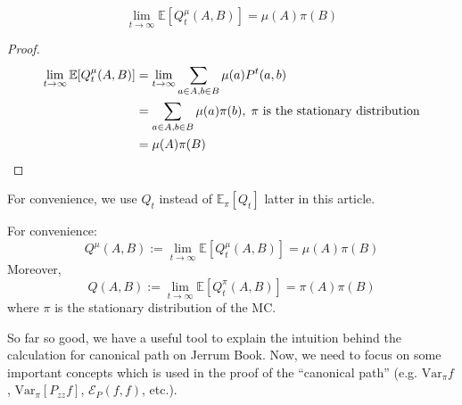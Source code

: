 \begin{corollary}
  \[\lim_{t\to\infty} \mathbb{E}[Q_t^\mu(A, B)] = \mu(A)\pi(B)\]
\end{corollary}
\begin{proof}
  \begin{align*}
    \lim_{t\to\infty} \mathbb{E}[Q_t^\mu(A, B)] &= \lim_{t\to\infty} \sum_{a\in A, b\in B} \mu(a)P^t(a, b) \\
    &= \sum_{a\in A, b\in B} \mu(a)\pi(b), \hspace{0.1cm} \mbox{$\pi$ is the stationary distribution} \\
    &= \mu(A)\pi(B) \qedhere
  \end{align*}
\end{proof}
For convenience, we use $Q_t$ instead of $\mathbb{E}_\pi [Q_t]$ latter in this article.
\begin{define}
  For convenience:
  \[Q^\mu(A, B) := \lim_{t\to\infty} \mathbb{E}[Q_t^\mu(A, B)] = \mu(A)\pi(B)\]
  \tcblower
  Moreover,
  \[Q(A, B) := \lim_{t\to\infty} \mathbb{E}[Q_t^\pi(A, B)] = \pi(A)\pi(B)\]
  where $\pi$ is the stationary distribution of the MC.
\end{define}
So far so good, we have a useful tool to explain the intuition behind the calculation for canonical path on Jerrum Book. Now, we need to focus on some important concepts which is used in the proof of the ``canonical path'' (e.g. $\mathrm{Var}_\pi f$, $\mathrm{Var}_\pi [P_{zz}f]$, $\mathcal{E}_P(f, f)$, etc.).
